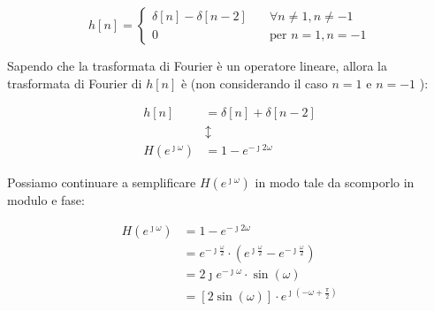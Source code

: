 {
    \Large 
    \begin{equation}
        h \left[ n\right]
        =
        \begin{cases}
        \delta \left[ n\right]
        - 
        \delta \left[ n - 2\right] 
        \quad &\forall n \neq 1, n \neq -1
        \\ 
        0 &\text{per } n = 1, n = -1
        \end{cases}
    \end{equation}
}

Sapendo che la trasformata di Fourier è un operatore lineare, 
allora la trasformata di Fourier di $h \left[ n\right]$ è (non considerando il caso $n = 1$ e $n = -1$ ): 

{
    \Large 
    \begin{equation}
        \begin{split}
        h \left[ n\right]
        &= 
        \delta \left[ n\right] 
        +
        \delta \left[ n - 2\right] 
        \\
        &\updownarrow
        \\ 
        H \left( e^{\jmath \omega}\right)
        &= 
        1 - e^{- \jmath 2\omega}
        \end{split}
    \end{equation}
}

Possiamo continuare a semplificare $H \left( e^{\jmath \omega}\right)$ in modo tale da scomporlo in modulo e fase: 

{
    \Large 
    \begin{equation}
        \begin{split}
            H \left(e^{\jmath \omega}\right)
            &= 
            1 - e^{- \jmath 2 \omega}
            \\
            &= 
            e^{- \jmath \frac{\omega}{2}} 
            \cdot 
            \left( 
                e^{\jmath \frac{\omega}{2}} 
                - 
                e^{- \jmath \frac{\omega}{2}} 
            \right)
            \\
            &= 
            2 \jmath e^{- \jmath \omega}
            \cdot 
            \sin \left( \omega\right)
            \\
            &= 
            \left[ 
                2 \sin \left( \omega\right) 
            \right]
            \cdot 
            e^{\jmath \left( - \omega + \frac{\pi}{2}\right)}
        \end{split}
    \end{equation}
}

